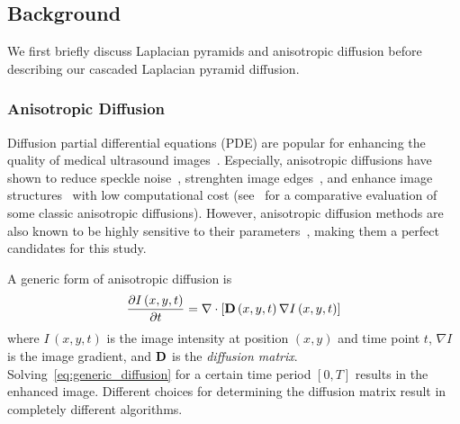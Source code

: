\subsection{Background}
We first briefly discuss Laplacian pyramids and anisotropic diffusion before describing our cascaded Laplacian pyramid diffusion.

\subsubsection{Anisotropic Diffusion}\label{section:diffusion}
%
Diffusion partial differential equations (PDE) are popular for enhancing the quality of medical ultrasound images~\cite{perona_scalespace_1990, weickert_anisotropic_1998, contrerasortiz_ultrasound_2012}.
Especially, anisotropic diffusions have shown to reduce speckle noise~\cite{yongjianyu_speckle_2002}, strenghten image edges~\cite{zhang_multiscale_2006}, and enhance image structures~\cite{abd-elmoniem_realtime_2002, kang_new_2016} with low computational cost (see~\cite{finn_echocardiographic_2011} for a comparative evaluation of some classic anisotropic diffusions).
However, anisotropic diffusion methods are also known to be highly sensitive to their parameters~\cite{duarte-salazar_speckle_2020}, making them a perfect candidates for this study.

A generic form of anisotropic diffusion is
\begin{align}
  \frac{\partial I\,(x, y, t)}{\partial t} = \nabla \cdot [ \mathbf{D}\,(x, y, t) \, \nabla I\,(x, y, t) ] \label{eq:generic_diffusion}
\end{align}
where \(I\,(x, y, t)\) is the image intensity at position \((x, y)\) and time point \(t\), \(\nabla I\) is the image gradient, and \(\mathbf{D}\) is the \textit{diffusion matrix}.
Solving~\cref{eq:generic_diffusion} for a certain time period \([0, T]\) results in the enhanced image.
Different choices for determining the diffusion matrix result in completely different algorithms.

